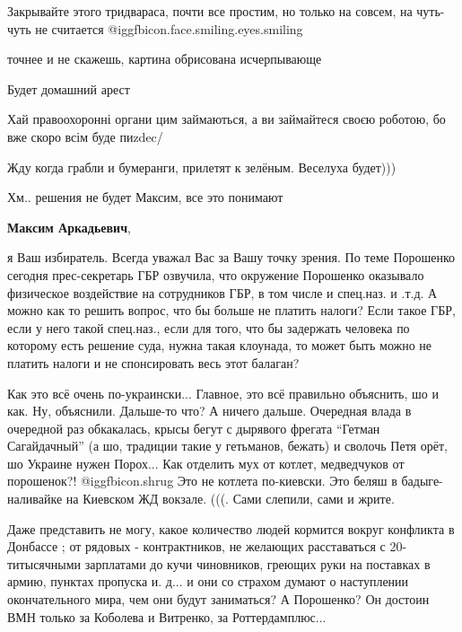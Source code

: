 \begin{itemize}
Закрывайте этого тридвараса, почти все простим, но только на совсем, на
чуть-чуть не считается  @igg{fbicon.face.smiling.eyes.smiling} 

точнее и не скажешь, картина обрисована исчерпывающе

Будет домашний арест

Хай правоохоронні органи цим займаються, а ви займайтеся своєю роботою, бо вже скоро всім буде пиzdec/

Жду когда грабли и бумеранги, прилетят к зелёным. Веселуха будет)))

Хм.. решения не будет Максим, все это понимают

\textbf{Максим Аркадьевич}, 

я Ваш избиратель. Всегда уважал Вас за Вашу точку зрения. По теме Порошенко
сегодня прес-секретарь ГБР озвучила, что окружение Порошенко оказывало
физическое воздействие на сотрудников ГБР, в том числе и спец.наз. и .т.д. А
можно как то решить вопрос, что бы больше не платить налоги? Если такое ГБР,
если у него такой спец.наз., если для того, что бы задержать человека по
которому есть решение суда, нужна такая клоунада, то может быть можно не
платить налоги и не спонсировать весь этот балаган?


Как это всё очень по-украински... Главное, это всё правильно объяснить, шо и
как. Ну, объяснили. Дальше-то что? А ничего дальше. Очередная влада в очередной
раз обкакалась, крысы бегут с дырявого фрегата \enquote{Гетман Сагайдачный} (а шо,
традиции такие у гетьманов, бежать) и сволочь Петя орёт, шо Украине нужен
Порох... Как отделить мух от котлет, медведчуков от порошенок?!  @igg{fbicon.shrug}  Это
не котлета по-киевски. Это беляш в бадыге-наливайке на Киевском ЖД вокзале.
(((. Сами слепили, сами и жрите.


Даже представить не могу, какое количество людей кормится вокруг конфликта в
Донбассе ; от рядовых - контрактников, не желающих расставаться с 20-
титысячными зарплатами до кучи чиновников, греющих руки на поставках в
армию, пунктах пропуска и. д... и они со страхом думают о наступлении
окончательного мира, чем они будут заниматься? А Порошенко? Он достоин ВМН
только за Коболева и Витренко, за Роттердамплюс...


\end{itemize} %
